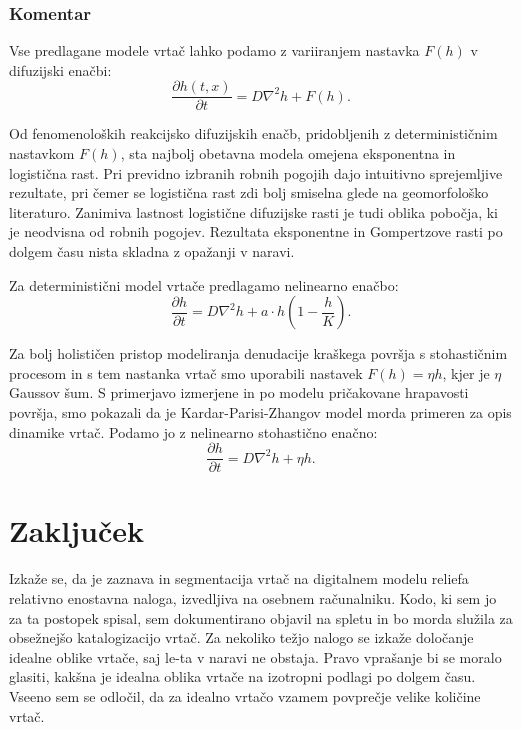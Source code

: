 \documentclass[a4paper, twoside, 12pt]{book}
\begin{document}
\subsection{Komentar}

Vse predlagane modele vrtač lahko podamo z variiranjem nastavka $F(h)$ v difuzijski enačbi:
\begin{equation}
  \frac{ \partial h(t,x) }{ \partial t} = D \nabla^2 h + F(h).
  \label{dinamicna-splosna3}
\end{equation}

Od fenomenoloških reakcijsko difuzijskih enačb, pridobljenih z determinističnim nastavkom $F(h)$, sta najbolj obetavna modela omejena eksponentna in logistična rast. Pri previdno izbranih robnih pogojih dajo intuitivno sprejemljive rezultate, pri čemer se logistična rast zdi bolj smiselna glede na geomorfološko literaturo. Zanimiva lastnost logistične difuzijske rasti je tudi oblika pobočja, ki je neodvisna od robnih pogojev.
Rezultata eksponentne in Gompertzove rasti po dolgem času nista skladna z opažanji v naravi.

Za deterministični model vrtače predlagamo nelinearno enačbo:
\begin{equation}
  \frac{ \partial h}{ \partial t} = D \nabla^2 h + a \cdot h (1 - \frac{h}{K}).
  \label{dinamicna-splosna4}
\end{equation}

Za bolj holističen pristop modeliranja denudacije kraškega površja s stohastičnim procesom in s tem nastanka vrtač smo uporabili nastavek $F(h) = \eta h$, kjer je $\eta$ Gaussov šum. S primerjavo izmerjene in po modelu pričakovane hrapavosti površja, smo pokazali da je Kardar-Parisi-Zhangov model morda primeren za opis dinamike vrtač. Podamo jo z nelinearno stohastično enačno:
\begin{equation}
  \frac{ \partial h}{ \partial t} = D \nabla^2 h + \eta h.
  \label{dinamicna-splosna5}
\end{equation}

    \chapter{Zaključek}

    Izkaže se, da je zaznava in segmentacija vrtač na digitalnem modelu reliefa relativno enostavna naloga, izvedljiva na osebnem računalniku. Kodo, ki sem jo za ta postopek spisal, sem dokumentirano objavil na spletu in bo morda služila za obsežnejšo katalogizacijo vrtač.
    Za nekoliko težjo nalogo se izkaže določanje idealne oblike vrtače, saj le-ta v naravi ne obstaja. Pravo vprašanje bi se moralo glasiti, kakšna je idealna oblika vrtače na izotropni podlagi po dolgem času. Vseeno sem se odločil, da za idealno vrtačo vzamem povprečje velike količine vrtač.
\end{document}
